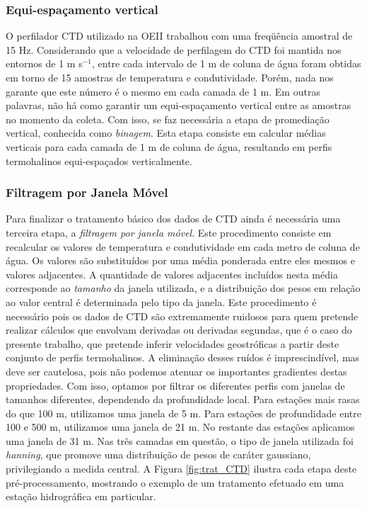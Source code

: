 \subsubsection{Equi-espaçamento vertical}\label{sec:binagem}

\hspace{6mm} O perfilador CTD utilizado na OEII trabalhou com uma 
freq\"uência amostral de 15 Hz. Considerando que a velocidade de perfilagem do CTD
foi mantida nos entornos de 1 m s$^{-1}$, entre cada intervalo de 1 m de coluna de água
foram obtidas em torno de 15 amostras de temperatura e condutividade. Porém, nada nos garante
que este número é o mesmo em cada camada de 1 m. Em outras palavras, não há como garantir
um equi-espaçamento vertical entre as amostras no momento da coleta. Com isso, se faz
necessária a etapa de promediação vertical, conhecida como {\it binagem}. Esta etapa 
consiste em calcular médias verticais para cada camada de 1 m de coluna de água, 
resultando em perfis termohalinos equi-espaçados verticalmente. 

\subsubsection{Filtragem por Janela Móvel}\label{sec:janela}

\hspace{6mm} Para finalizar o tratamento básico dos dados de CTD ainda é necessária uma terceira
etapa, a {\it filtragem por janela móvel}. Este procedimento consiste em recalcular
os valores de temperatura e condutividade em cada metro de coluna de água. Os valores
são substituídos por uma média ponderada entre eles mesmos e valores adjacentes. 
A quantidade de valores adjacentes incluídos nesta média corresponde ao {\it tamanho}
da janela utilizada, e a distribuição dos pesos em relação ao valor central é determinada
pelo tipo da janela. Este procedimento é necessário pois os dados de CTD são extremamente ruidosos
para quem pretende realizar cálculos que envolvam derivadas ou derivadas segundas, 
que é o caso do presente trabalho, que pretende inferir velocidades geostróficas
a partir deste conjunto de perfis termohalinos. A eliminação desses ruídos é imprescindível, 
mas deve ser cautelosa, pois não podemos atenuar os importantes gradientes 
destas propriedades. Com isso, optamos por filtrar os diferentes perfis com janelas de tamanhos 
diferentes, dependendo da profundidade local. Para estações mais rasas do que 100 m,
utilizamos uma janela de 5 m. 
Para estações de profundidade entre 100 e 500 m, utilizamos
uma janela de 21 m. No restante das estações aplicamos uma janela de 31 m. Nas três camadas em questão, 
o tipo de janela utilizada foi {\it hanning}, que promove uma distribuição de 
pesos de caráter gaussiano, privilegiando a medida central. A Figura \ref{fig:trat_CTD}
ilustra cada etapa deste pré-processamento, mostrando o exemplo
de um tratamento efetuado em uma estação hidrográfica em particular.

